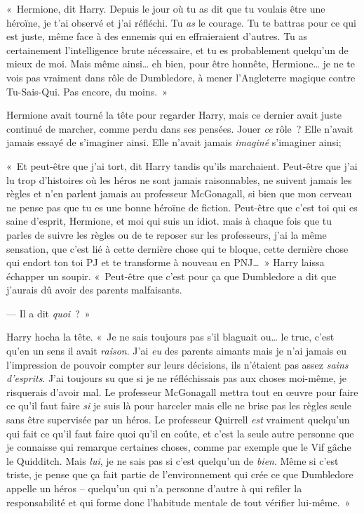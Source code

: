 «~Hermione, dit Harry.
Depuis le jour où tu as dit que tu voulais être une héroïne, je t'ai observé et j'ai réfléchi.
Tu \emph{as} le courage.
Tu te battras pour ce qui est juste, même face à des ennemis qui en effraieraient d'autres.
Tu as certainement l'intelligence brute nécessaire, et tu es probablement quelqu'un de mieux de moi.
Mais même ainsi… eh bien, pour être honnête, Hermione… je ne te vois pas vraiment dans rôle de Dumbledore, à mener l'Angleterre magique contre Tu-Sais-Qui.
Pas encore, du moins.~»

Hermione avait tourné la tête pour regarder Harry, mais ce dernier avait juste continué de marcher, comme perdu dans ses pensées.
Jouer \emph{ce} rôle~?
Elle n'avait jamais essayé de s'imaginer ainsi.
Elle n'avait jamais \emph{imaginé} s'imaginer ainsi;

«~Et peut-être que j'ai tort, dit Harry tandis qu'ils marchaient.
Peut-être que j'ai lu trop d'histoires où les héros ne sont jamais raisonnables, ne suivent jamais les règles et n'en parlent jamais au professeur McGonagall, si bien que mon cerveau ne pense pas que tu es une bonne héroïne de fiction.
Peut-être que c'est toi qui es saine d'esprit, Hermione, et moi qui suis un idiot. mais à chaque fois que tu parles de suivre les règles ou de te reposer sur les professeurs, j'ai la même sensation, que c'est lié à cette dernière chose qui te bloque, cette dernière chose qui endort ton toi PJ et te transforme à nouveau en PNJ…~»
Harry laissa échapper un soupir.
«~Peut-être que c'est pour ça que Dumbledore a dit que j'aurais dû avoir des parents malfaisants.

--- Il a dit \emph{quoi}~?~»

Harry hocha la tête.
«~Je ne sais toujours pas s'il blaguait ou… le truc, c'est qu'en un sens il avait \emph{raison}.
J'ai \emph{eu} des parents aimants mais je n'ai jamais eu l'impression de pouvoir compter sur leurs décisions, ils n'étaient pas assez \emph{sains d'esprits}.
J'ai toujours su que si je ne réfléchissais pas aux choses moi-même, je risquerais d'avoir mal.
Le professeur McGonagall mettra tout en œuvre pour faire ce qu'il faut faire \emph{si} je suis là pour harceler mais elle ne brise pas les règles seule sans être supervisée par un héros.
Le professeur Quirrell \emph{est} vraiment quelqu'un qui fait ce qu'il faut faire quoi qu'il en coûte, et c'est la seule autre personne que je connaisse qui remarque certaines choses, comme par exemple que le Vif gâche le Quidditch.
Mais \emph{lui}, je ne sais pas si c'est quelqu'un de \emph{bien}.
Même si c'est triste, je pense que ça fait partie de l'environnement qui crée ce que Dumbledore appelle un héros -- quelqu'un qui n'a personne d'autre à qui refiler la responsabilité et qui forme donc l'habitude mentale de tout vérifier lui-même.~»

